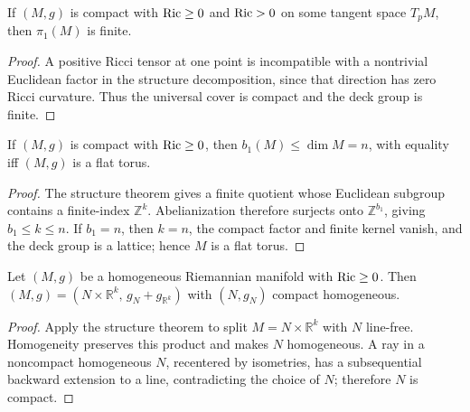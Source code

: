 \begin{corollary}
  \label{cor:pet-ch7-finite-fundamental-group-positive-ricci}

  If $(M,g)$ is compact with $\operatorname{Ric}\ge0$ and $\operatorname{Ric}>0$ on some tangent space
  $T_pM$, then $\pi_1(M)$ is finite.
\end{corollary}
\begin{proof}
  \sketch
  A positive Ricci tensor at one point is incompatible with a nontrivial Euclidean factor in the structure decomposition, since that direction has zero Ricci curvature. Thus the universal cover is compact and the deck group is finite.
\end{proof}

\begin{corollary}
  \label{cor:pet-ch7-first-betti-number-bound}

  If $(M,g)$ is compact with $\operatorname{Ric}\ge0$, then $b_1(M)\le\dim M=n$, with
  equality iff $(M,g)$ is a flat torus.
\end{corollary}
\begin{proof}
  \sketch
  The structure theorem gives a finite quotient whose Euclidean subgroup contains a finite-index \(\mathbb Z^k\). Abelianization therefore surjects onto \(\mathbb Z^{b_1}\), giving \(b_1\le k\le n\). If \(b_1=n\), then \(k=n\), the compact factor and finite kernel vanish, and the deck group is a lattice; hence \(M\) is a flat torus.
\end{proof}

\begin{theorem}
  \label{thm:pet-ch7-homogeneous-splitting}

  Let $(M,g)$ be a homogeneous Riemannian manifold with $\operatorname{Ric}\ge0$. Then
  $(M,g)=(N\times\mathbb{R}^k,\,g_N+g_{\mathbb{R}^k})$ with $(N,g_N)$ compact homogeneous.
\end{theorem}
\begin{proof}
  \sketch
  Apply the structure theorem to split \(M=N\times\mathbb R^k\) with \(N\) line-free. Homogeneity preserves this product and makes \(N\) homogeneous. A ray in a noncompact homogeneous \(N\), recentered by isometries, has a subsequential backward extension to a line, contradicting the choice of \(N\); therefore \(N\) is compact.
\end{proof}

